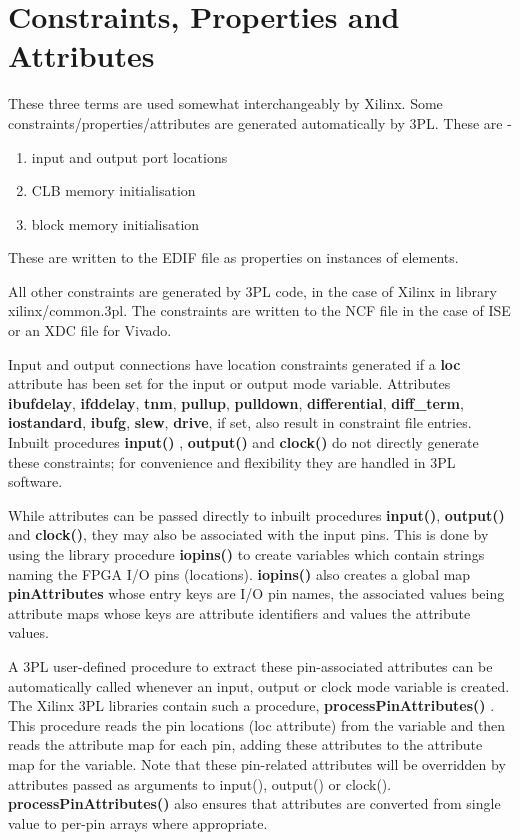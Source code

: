 \pagebreak

\chapter{Constraints, Properties and Attributes}\label{chap:cpa}
    
    These three terms are used somewhat interchangeably by Xilinx.
    Some constraints/properties/attributes are generated automatically by 3PL.
    These are -
    \begin{enumerate}
    \item   input and output port locations
    \item   CLB memory initialisation
    \item   block memory initialisation
    \end{enumerate}
    These are written to the EDIF file as properties on instances of elements.
    
    All other constraints are generated by 3PL code, in the case of Xilinx in
    library xilinx/common.3pl. The constraints are written to the NCF file in the
    case of ISE or an XDC file for Vivado.
    
    Input and output connections have location constraints generated if a {\bf
    loc} attribute has been set for the input or output mode variable. Attributes
    {\bf ibufdelay}, {\bf ifddelay}, {\bf tnm}, {\bf pullup}, {\bf pulldown},
    {\bf differential}, {\bf diff\_term}, {\bf iostandard}, {\bf ibufg}, {\bf
    slew}, {\bf drive}, if set, also result in constraint file entries.  
    Inbuilt procedures {\bf input()} , {\bf
    output()}  and {\bf clock()}  do
    not directly generate these constraints; for convenience and flexibility they
    are handled in 3PL software.

    While attributes can be passed directly to inbuilt procedures {\bf input()},
    {\bf output()} and {\bf clock()}, they may also be associated with the input pins. This
    is done by using the library procedure {\bf iopins()}
     to create variables which contain strings naming the
    FPGA I/O pins (locations). {\bf iopins()} also creates a global map {\bf
    pinAttributes} whose entry keys are I/O pin names, the associated values
    being attribute maps whose keys are attribute identifiers and values the
    attribute values.

    A 3PL user-defined procedure to extract these pin-associated attributes can be
    automatically called whenever an input, output or clock mode variable is
    created. The Xilinx 3PL libraries contain such a procedure, {\bf
    processPinAttributes()} . This procedure reads the
    pin locations (loc attribute) from the variable and then reads the attribute
    map for each pin, adding these attributes to the attribute map for the
    variable. Note that these pin-related attributes will be overridden by
    attributes passed as arguments to input(), output() or clock(). {\bf
    processPinAttributes()} also ensures that attributes are converted from single
    value to per-pin arrays where appropriate.

